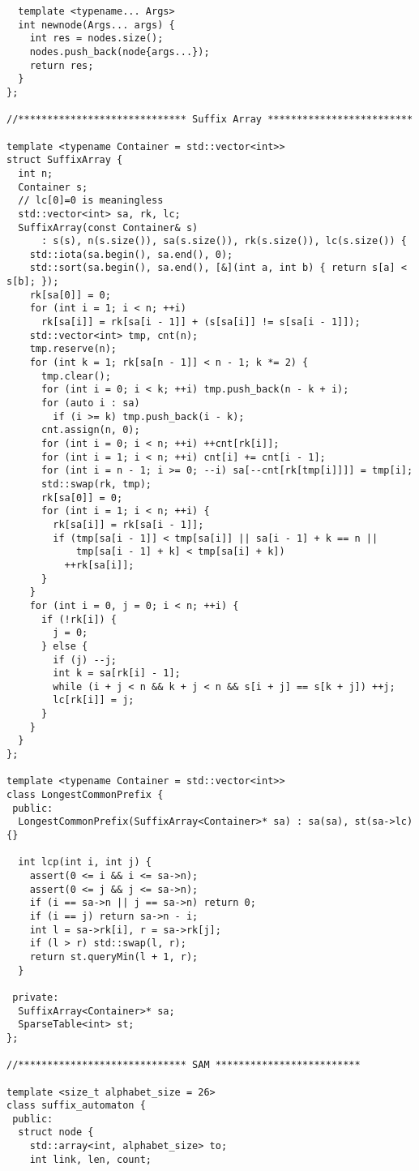 \documentclass{article}
\begin{document}
\begin{lstlisting}
  template <typename... Args>
  int newnode(Args... args) {
    int res = nodes.size();
    nodes.push_back(node{args...});
    return res;
  }
};

//***************************** Suffix Array *************************

template <typename Container = std::vector<int>>
struct SuffixArray {
  int n;
  Container s;
  // lc[0]=0 is meaningless
  std::vector<int> sa, rk, lc;
  SuffixArray(const Container& s)
      : s(s), n(s.size()), sa(s.size()), rk(s.size()), lc(s.size()) {
    std::iota(sa.begin(), sa.end(), 0);
    std::sort(sa.begin(), sa.end(), [&](int a, int b) { return s[a] < s[b]; });
    rk[sa[0]] = 0;
    for (int i = 1; i < n; ++i)
      rk[sa[i]] = rk[sa[i - 1]] + (s[sa[i]] != s[sa[i - 1]]);
    std::vector<int> tmp, cnt(n);
    tmp.reserve(n);
    for (int k = 1; rk[sa[n - 1]] < n - 1; k *= 2) {
      tmp.clear();
      for (int i = 0; i < k; ++i) tmp.push_back(n - k + i);
      for (auto i : sa)
        if (i >= k) tmp.push_back(i - k);
      cnt.assign(n, 0);
      for (int i = 0; i < n; ++i) ++cnt[rk[i]];
      for (int i = 1; i < n; ++i) cnt[i] += cnt[i - 1];
      for (int i = n - 1; i >= 0; --i) sa[--cnt[rk[tmp[i]]]] = tmp[i];
      std::swap(rk, tmp);
      rk[sa[0]] = 0;
      for (int i = 1; i < n; ++i) {
        rk[sa[i]] = rk[sa[i - 1]];
        if (tmp[sa[i - 1]] < tmp[sa[i]] || sa[i - 1] + k == n ||
            tmp[sa[i - 1] + k] < tmp[sa[i] + k])
          ++rk[sa[i]];
      }
    }
    for (int i = 0, j = 0; i < n; ++i) {
      if (!rk[i]) {
        j = 0;
      } else {
        if (j) --j;
        int k = sa[rk[i] - 1];
        while (i + j < n && k + j < n && s[i + j] == s[k + j]) ++j;
        lc[rk[i]] = j;
      }
    }
  }
};

template <typename Container = std::vector<int>>
class LongestCommonPrefix {
 public:
  LongestCommonPrefix(SuffixArray<Container>* sa) : sa(sa), st(sa->lc) {}

  int lcp(int i, int j) {
    assert(0 <= i && i <= sa->n);
    assert(0 <= j && j <= sa->n);
    if (i == sa->n || j == sa->n) return 0;
    if (i == j) return sa->n - i;
    int l = sa->rk[i], r = sa->rk[j];
    if (l > r) std::swap(l, r);
    return st.queryMin(l + 1, r);
  }

 private:
  SuffixArray<Container>* sa;
  SparseTable<int> st;
};

//***************************** SAM *************************

template <size_t alphabet_size = 26>
class suffix_automaton {
 public:
  struct node {
    std::array<int, alphabet_size> to;
    int link, len, count;


\end{lstlisting}
\end{document}
